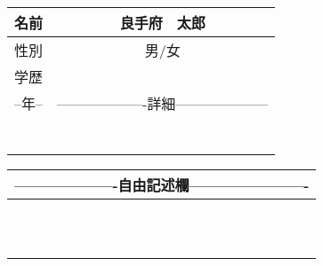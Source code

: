 \documentclass[]{jarticle}
\begin{document}
\begin{center}
\begin{tabular}[t]{|c|c|}
	\hline
	名前 & 良手府　太郎 \\
	\hline
	性別 & 男/女 \\
	\hline
	\cline{1-1}
	学歴 \\
	\hline
	--年-- & -------------------詳細-------------------- \\
	\hline
	 & \\
	\hline
	 & \\
	 \hline
	 & \\
	 \hline
	 & \\
	 \hline
	 & \\
	 \hline
	 & \\
	 \hline
	 & \\
	 \hline
	 \end{tabular}
	 \begin{tabular}[a]{|c|}
	\hline
	-------------------自由記述欄----------------------\\
	\hline
	  \\
	  \\
	  \\
	  \\
	  \\
	  \\
	  \\
	  \\
	  \\
	  \\
	  \\
	  \hline
\end{tabular}
\end{center}
\end{document}
